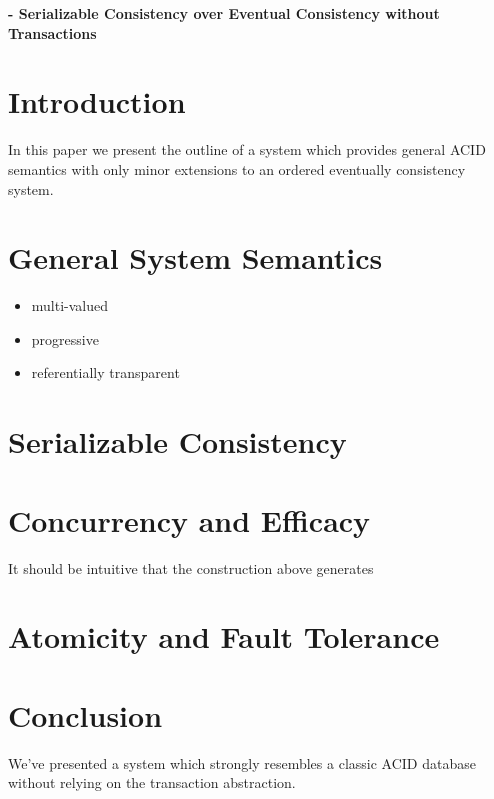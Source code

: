 


\suppressfloats

\parbox{14.5cm}{
    {\LARGE \bf  - Serializable Consistency over Eventual Consistency without Transactions\\} 
}


\section{Introduction}
In this paper we present the outline of a system which provides general ACID semantics
with only minor extensions to an ordered eventually consistency system.

\section{General System Semantics}

\begin{itemize}
   \item multi-valued
   \item progressive
   \item referentially transparent
\end{itemize}

\section{Serializable Consistency}

\section{Concurrency and Efficacy}
It should be intuitive that the construction above generates 


\section{Atomicity and Fault Tolerance}

\section{Conclusion}
We've presented a system which strongly resembles a classic ACID database
without relying on the transaction abstraction.

 

